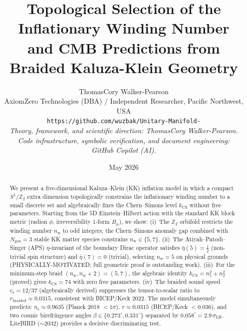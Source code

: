\documentclass[12pt,a4paper]{article}
\newcommand{\nw}{n_{\mathrm{w}}}
\newcommand{\kcs}{k_{\mathrm{CS}}}
\newcommand{\cs}{c_{\mathrm{s}}}
\newcommand{\ns}{n_{\mathrm{s}}}
\newcommand{\Bmu}{B_{\mu}}
\begin{document}
\title{\textbf{Topological Selection of the Inflationary Winding Number}\\
\textbf{and CMB Predictions from Braided Kaluza-Klein Geometry}}

\author{ThomasCory Walker-Pearson\\[4pt]
\small AxiomZero Technologies (DBA) / Independent Researcher, Pacific Northwest, USA\\[2pt]
\small \texttt{https://github.com/wuzbak/Unitary-Manifold-}\\[4pt]
\small\itshape Theory, framework, and scientific direction: ThomasCory Walker-Pearson.\\
\small\itshape Code infrastructure, symbolic verification, and document engineering:\\
\small\itshape GitHub Copilot (AI).}

\date{May 2026}
\maketitle

\begin{abstract}
We present a five-dimensional Kaluza--Klein (KK) inflation model in which a
compact $S^1/\mathbb{Z}_2$ extra dimension topologically constrains the
inflationary winding number to a small discrete set and algebraically fixes the
Chern--Simons level $\kcs$ without free parameters.  Starting from the
$5$D Einstein--Hilbert action with the standard KK block metric (radion $\phi$,
irreversibility 1-form $\Bmu$), we show:
(i)~The $\mathbb{Z}_2$ orbifold restricts the winding number $\nw$ to odd
integers; the Chern--Simons anomaly gap combined with $N_{\mathrm{gen}}=3$ stable
KK matter species constrains $\nw \in \{5,7\}$.
(ii)~The Atiyah--Patodi--Singer (APS) $\eta$-invariant of the boundary Dirac
operator satisfies $\bar\eta(5)=\tfrac{1}{2}$ (non-trivial spin structure) and
$\bar\eta(7)=0$ (trivial), selecting $\nw=5$ on physical grounds
(PHYSICALLY-MOTIVATED; full geometric proof is outstanding work).
(iii)~For the minimum-step braid $(\nw,\nw{+}2)=(5,7)$, the algebraic identity
$\kcs = n_1^2+n_2^2$ (proved) gives $\kcs=74$ with zero free parameters.
(iv)~The braided sound speed $\cs=12/37$ (algebraically derived) suppresses the
tensor-to-scalar ratio to $r_{\mathrm{braided}}\approx 0.0315$, consistent
with BICEP/Keck 2022.
The model simultaneously predicts:
$\ns\approx 0.9635$ (Planck 2018 $< 1\sigma$),
$r\approx 0.0315$ (BICEP/Keck $<0.036$), and
two cosmic birefringence angles $\beta\in\{0.273^\circ, 0.331^\circ\}$
separated by $0.058^\circ = 2.9\,\sigma_{\mathrm{LB}}$.
LiteBIRD ($\sim$2032) provides a decisive discriminating test.
\end{abstract}
\end{document}
